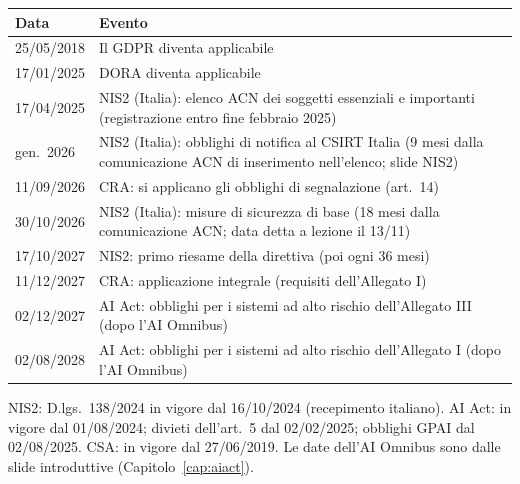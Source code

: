 \begin{center}
\small
\begin{tabularx}{\linewidth}{l X}
\toprule
\textbf{Data} & \textbf{Evento} \\ \midrule
25/05/2018 & Il GDPR diventa applicabile \\
17/01/2025 & DORA diventa applicabile \\
17/04/2025 & NIS2 (Italia): elenco ACN dei soggetti essenziali e importanti (registrazione entro fine
  febbraio 2025) \\
gen.~2026 & NIS2 (Italia): obblighi di notifica al CSIRT Italia (9 mesi dalla comunicazione ACN di
  inserimento nell'elenco; slide NIS2) \\
11/09/2026 & CRA: si applicano gli obblighi di segnalazione (art.~14) \\
30/10/2026 & NIS2 (Italia): misure di sicurezza di base (18 mesi dalla comunicazione ACN; data detta a
  lezione il 13/11) \\
17/10/2027 & NIS2: primo riesame della direttiva (poi ogni 36 mesi) \\
11/12/2027 & CRA: applicazione integrale (requisiti dell'Allegato I) \\
02/12/2027 & AI Act: obblighi per i sistemi ad alto rischio dell'Allegato III (dopo l'AI Omnibus) \\
02/08/2028 & AI Act: obblighi per i sistemi ad alto rischio dell'Allegato I (dopo l'AI Omnibus) \\ \bottomrule
\end{tabularx}
\end{center}

\begin{integrazione}
NIS2: D.lgs.~138/2024 in vigore dal 16/10/2024 (recepimento italiano). AI Act: in vigore dal 01/08/2024;
divieti dell'art.~5 dal 02/02/2025; obblighi GPAI dal 02/08/2025. CSA: in vigore dal 27/06/2019.
Le date dell'AI Omnibus sono dalle slide introduttive (Capitolo~\ref{cap:aiact}).
\end{integrazione}

